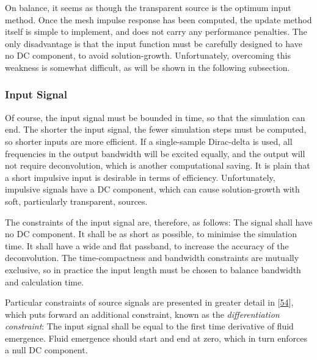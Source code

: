 \documentclass[]{scrreprt}
\begin{document}
On balance, it seems as though the transparent source is the optimum
input method. Once the mesh impulse response has been computed, the
update method itself is simple to implement, and does not carry any
performance penalties. The only disadvantage is that the input function
must be carefully designed to have no DC component, to avoid
solution-growth. Unfortunately, overcoming this weakness is somewhat
difficult, as will be shown in the following subsection.

\subsubsection{Input Signal}\label{input-signal}

Of course, the input signal must be bounded in time, so that the
simulation can end. The shorter the input signal, the fewer simulation
steps must be computed, so shorter inputs are more efficient. If a
single-sample Dirac-delta is used, all frequencies in the output
bandwidth will be excited equally, and the output will not require
deconvolution, which is another computational saving. It is plain that a
short impulsive input is desirable in terms of efficiency.
Unfortunately, impulsive signals have a DC component, which can cause
solution-growth with soft, particularly transparent, sources.

The constraints of the input signal are, therefore, as follows: The
signal shall have no DC component. It shall be as short as possible, to
minimise the simulation time. It shall have a wide and flat passband, to
increase the accuracy of the deconvolution. The time-compactness and
bandwidth constraints are mutually exclusive, so in practice the input
length must be chosen to balance bandwidth and calculation time.

Particular constraints of source signals are presented in greater detail
in {[}\protect\hyperlink{ref-sheafferux5fphysicalux5f2014}{54}{]}, which
puts forward an additional constraint, known as the
\emph{differentiation constraint}: The input signal shall be equal to
the first time derivative of fluid emergence. Fluid emergence should
start and end at zero, which in turn enforces a null DC component.
\end{document}
